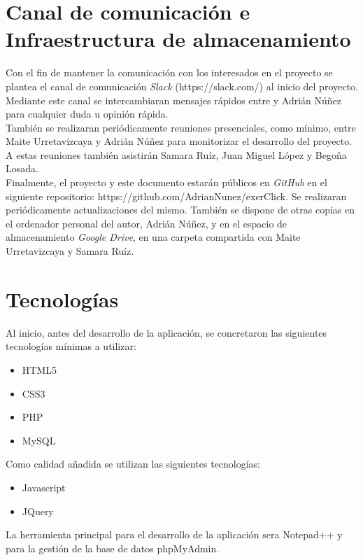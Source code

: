 \section{Canal de comunicación e Infraestructura de almacenamiento}

Con el fin de mantener la comunicación con los interesados en el proyecto se plantea el canal de comunicación \textit{Slack} (https://slack.com/) al inicio del proyecto. Mediante este canal se intercambiaran mensajes rápidos entre  y Adrián Núñez para cualquier duda u opinión rápida.\\

También se realizaran periódicamente reuniones presenciales, como mínimo, entre Maite Urretavizcaya y Adrián Núñez para monitorizar el desarrollo del proyecto. A estas reuniones también asistirán Samara Ruíz, Juan Miguel López y Begoña Losada.\\

Finalmente, el proyecto y este documento estarán públicos en \textit{GitHub} en el siguiente repositorio: https://github.com/AdrianNunez/exerClick. Se realizaran periódicamente actualizaciones del mismo. También se dispone de otras copias en el ordenador personal del autor, Adrián Núñez, y en el espacio de almacenamiento \textit{Google Drive}, en una carpeta compartida con Maite Urretavizcaya y Samara Ruíz.\\

\section{Tecnologías}
\label{step0:tecnologias}

Al inicio, antes del desarrollo de la aplicación, se concretaron las siguientes tecnologías mínimas a utilizar:

\begin{itemize}
\item HTML5
\item CSS3
\item PHP
\item MySQL
\end{itemize}

Como calidad añadida se utilizan las siguientes tecnologías:

\begin{itemize}
\item Javascript
\item JQuery
\end{itemize}

La herramienta principal para el desarrollo de la aplicación sera Notepad++ y para la gestión de la base de datos phpMyAdmin.\\

